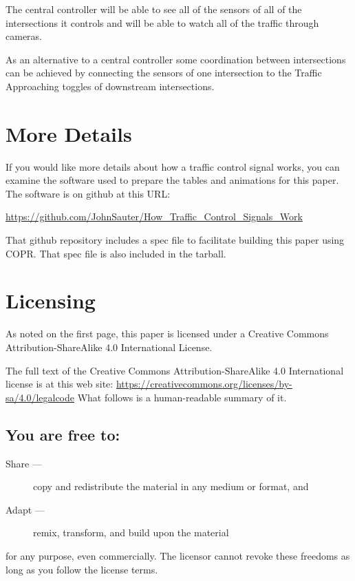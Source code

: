 \documentclass[letterpaper,twoside]{article}
\begin{document}
The central controller will be able to see all of the sensors of all
of the intersections it controls and will be able to watch all of
the traffic through cameras.

As an alternative to a central controller some coordination between
intersections can be achieved by connecting the sensors of one intersection
to the Traffic Approaching toggles of downstream intersections.

\section{More Details}

If you would like more details about how a traffic control signal works,
you can examine the software used to prepare the tables and animations
for this paper.  The software is on github at this URL:

\begin{center}

\href{https://github.com/JohnSauter/How\_Traffic\_Control\_Signals\_Work}{https://github.com/JohnSauter/How\_Traffic\_Control\_Signals\_Work}

\end{center}

That github repository includes a spec file to facilitate building
this paper using COPR.  That spec file is also included in the tarball.

\section{Licensing}
\label{section:Licensing}
As noted on the first page, this paper is licensed under a Creative
Commons Attribution-ShareAlike 4.0 International License.

The full text of the Creative Commons Attribution-ShareAlike 4.0
International license is at this web site:
\href{https://creativecommons.org/licenses/by-sa/4.0/legalcode}{https://creativecommons.org/licenses/by-sa/4.0/legalcode}
What follows is a human-readable summary of it.

\subsection{You are free to:}
\begin{description}
\item[Share ---]copy and redistribute the material in any medium or format, and
\item[Adapt ---]remix, transform, and build upon the material
\end{description}
for any purpose, even commercially.  The licensor cannot revoke these
freedoms as long as you follow the license terms.
\end{document}
